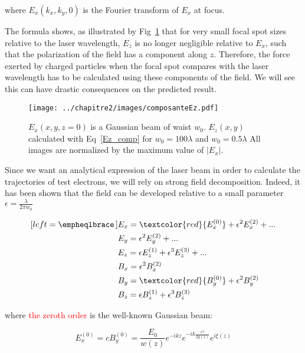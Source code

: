 \noindent where $E_x(k_x,k_y,0)$ is the Fourier transform of $E_x$ at focus.

\noindent The formula shows, as illustrated by Fig~\ref{fig:composanteEz} that for very small focal spot sizes relative to the laser wavelength, $E_z$ is no longer negligible relative to $E_x$, such that the polarization of the field has a component along $z$. Therefore, the force exerted by charged particles when the focal spot compares with the laser wavelength has to be calculated using these components of the field. We will see this can have drastic consequences on the predicted result.

\begin{figure}[!h]
\centering
\texttt{[image: ../chapitre2/images/composanteEz.pdf]}\\
\caption{\label{fig:composanteEz} $E_x(x,y,z=0)$ is a Gaussian beam of waist $w_0$.  $E_z(x,y)$ calculated with Eq~\ref{Ez_comp} for $w_0 = 100\lambda$ and $w_0 = 0.5\lambda$ All images are normalized by the maximum value of $|E_x|$.}
\end{figure}

\noindent Since we want an analytical expression of the laser beam in order to calculate the trajectories of test electrons, we will rely on strong field decomposition. Indeed, it  has been shown \cite{quesnel1998theory} that the field can be developed relative to a small parameter $\epsilon = \frac{\lambda}{2\pi w_0}$


\begin{subequations}
\label{ex:expansionSeries}
\begin{align}[left = \empheqlbrace\,]
&E_x =\textcolor{red}{E_x^{(0)}} + \epsilon^2 E_x^{(2)} + ...\\
&E_y= \epsilon^2 E_y^{(2)} +... \\
&E_z = \epsilon E_z^{(1)} + \epsilon^3 E_z^{(3)}+...\\
&B_x=\epsilon^2 B_x^{(2)} \\
&B_y= \textcolor{red}{B_y^{(0)}} + \epsilon^2 B_y^{(2)}\\
&B_z=\epsilon B_z^{(1)} + \epsilon^3 B_z^{(3)}
\end{align}
\end{subequations}

\noindent where \textcolor{red}{the zeroth order} is the well-known Gaussian beam:

\begin{equation}
E_x^{(0)} = cB_y^{(0)} = \frac{E_0}{w(z)}e^{-ikz}e^{-ik\frac{r^2}{2q(z)}}e^{i\xi(z)}
\end{equation}

